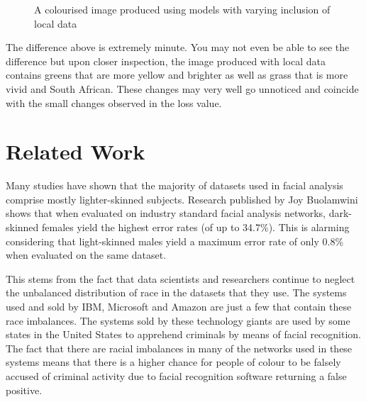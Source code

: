 \documentclass[conference]{IEEEtran}
\begin{document}
\begin{figure}[h]
    \centering
    \qquad
    \caption{A colourised image produced using models with varying inclusion of local data}%
    \label{fig:inclusion_compare}
\end{figure}

The difference above is extremely minute. You may not even be able to see the difference but upon closer inspection, the image produced with local data contains greens that are more yellow and brighter as well as grass that is more vivid and South African. These changes may very well go unnoticed and coincide with the small changes observed in the loss value.

\section{Related Work}

Many studies have shown that the majority of datasets used in facial analysis comprise mostly lighter-skinned subjects. Research published by Joy Buolamwini \cite{buolamwini2018gender} shows that when evaluated on industry standard facial analysis networks, dark-skinned females yield the highest error rates (of up to 34.7\%). This is alarming considering that light-skinned males yield a maximum error rate of only 0.8\% when evaluated on the same dataset. \cite{corbett2018measure}

This stems from the fact that data scientists and researchers continue to neglect the unbalanced distribution of race in the datasets that they use. The systems used and sold by IBM, Microsoft and Amazon are just a few that contain these race imbalances. The systems sold by these technology giants are used by some states in the United States to apprehend criminals by means of facial recognition. The fact that there are racial imbalances in many of the networks used in these systems means that there is a higher chance for people of colour to be falsely accused of criminal activity due to facial recognition software returning a false positive. 
\end{document}

